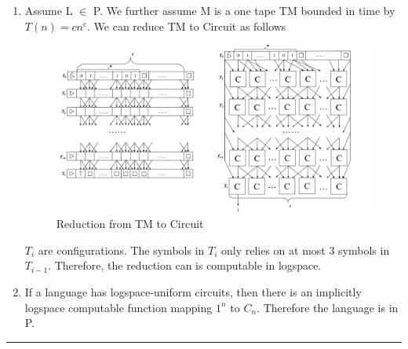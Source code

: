 \documentclass[twoside]{article}
\newenvironment{solution}{{\bf Solution:}}{\hfill\rule{2mm}{2mm}}
\begin{document}
\begin{solution}
\begin{enumerate}
	\item Assume L $\in$ P. We further assume M is a one tape TM bounded in time by $T(n)=cn^c$.  We can reduce TM to Circuit as follows
	\begin{figure}[!htp]
		\centering
		\includegraphics[width=5in]{fig.jpg}
		\caption{Reduction from TM to Circuit}
	\end{figure}
	$T_i$ are configurations. The symbols in $T_i$ only relies on at most 3 symbols in $T_{i-1}$. Therefore, the reduction can is computable in logspace.
	\item If a language has logspace-uniform circuits, then there is an implicitly logspace
	computable function mapping $1^n$ to $C_n$. Therefore the language is in P. 
\end{enumerate}
\end{solution}
\end{document}
